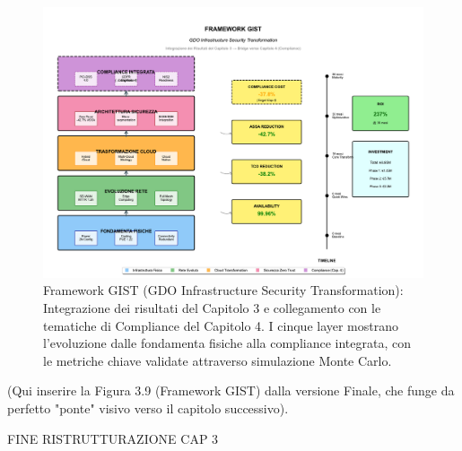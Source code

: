 \begin{figure}[htbp]
\centering
\includegraphics[width=\textwidth]{thesis_figures/cap3/figura_3_6_framework_integrato.pdf}
\caption{Framework GIST (GDO Infrastructure Security Transformation): 
         Integrazione dei risultati del Capitolo 3 e collegamento con 
         le tematiche di Compliance del Capitolo 4. I cinque layer mostrano 
         l'evoluzione dalle fondamenta fisiche alla compliance integrata, 
         con le metriche chiave validate attraverso simulazione Monte Carlo.}
\label{fig:framework_gist}
\end{figure}

(Qui inserire la Figura 3.9 (Framework GIST) dalla versione Finale, che funge da perfetto "ponte" visivo verso il capitolo successivo).

FINE RISTRUTTURAZIONE CAP 3

\clearpage
\printbibliography[
    heading=subbibliography, %
    title={Riferimenti Bibliografici del Capitolo 3}, %
]

\endrefsection %





